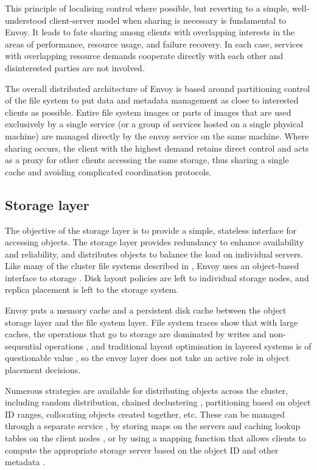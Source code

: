 This principle of localising control where possible, but reverting to a simple, well-understood client-server model when sharing is necessary is fundamental to Envoy. It leads to fate sharing among clients with overlapping interests in the areas of performance, resource usage, and failure recovery. In each case, services with overlapping resource demands cooperate directly with each other and disinterested parties are not involved.

The overall distributed architecture of Envoy is based around partitioning control of the file system to put data and metadata management as close to interested clients as possible. Entire file system images or parts of images that are used exclusively by a single service (or a group of services hosted on a single physical machine) are managed directly by the envoy service on the same machine. Where sharing occurs, the client with the highest demand retains direct control and acts as a proxy for other clients accessing the same storage, thus sharing a single cache and avoiding complicated coordination protocols.

\subsection{Storage layer}

The objective of the storage layer is to provide a simple, stateless interface for accessing objects. The storage layer provides redundancy to enhance availability and reliability, and distributes objects to balance the load on individual servers. Like many of the cluster file systems described in , Envoy uses an object-based interface to storage \cite{factor}. Disk layout policies are left to individual storage nodes, and replica placement is left to the storage system.

Envoy puts a memory cache and a persistent disk cache between the object storage layer and the file system layer. File system traces show that with large caches, the operations that go to storage are dominated by writes and non-sequential operations \cite{ruemmler}, and traditional layout optimisation in layered systems is of questionable value \cite{stein05}, so the envoy layer does not take an active role in object placement decisions.

Numerous strategies are available for distributing objects across the cluster, including random distribution, chained declustering \cite{hsiao}, partitioning based on object ID ranges, collocating objects created together, etc. These can be managed through a separate service \cite{gibson98a}, by storing maps on the servers and caching lookup tables on the client nodes \cite{lee96}, or by using a mapping function that allows clients to compute the appropriate storage server based on the object ID and other metadata \cite{weil06}.

